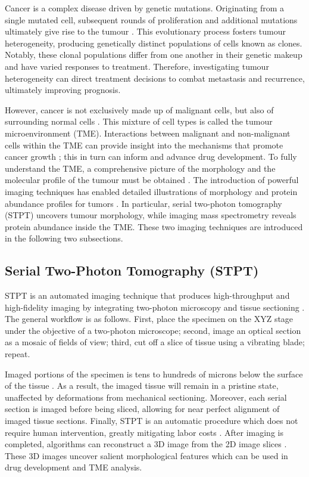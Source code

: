 \documentclass[10pt,twocolumn,letterpaper]{article}
\begin{document}
Cancer is a complex disease driven by genetic mutations. Originating from a single mutated cell, subsequent rounds of proliferation and additional mutations ultimately give rise to the tumour \cite{nowell_1976_the}. This evolutionary process fosters tumour heterogeneity, producing genetically distinct populations of cells known as clones. Notably, these clonal populations differ from one another in their genetic makeup and have varied responses to treatment. Therefore, investigating tumour heterogeneity can direct treatment decisions to combat metastasis and recurrence, ultimately improving prognosis.

However, cancer is not exclusively made up of malignant cells, but also of surrounding normal cells \cite{junttila_2013_influence}. This mixture of cell types is called the tumour microenvironment (TME). Interactions between malignant and non-malignant cells within the TME can provide insight into the mechanisms that promote cancer growth \cite{egeblad_2010_tumors}; this in turn can inform and advance drug development. To fully understand the TME, a comprehensive picture of the morphology and the molecular profile of the tumour must be obtained \cite{heindl_2015_mapping}. The introduction of powerful imaging techniques has enabled detailed illustrations of morphology and protein abundance profiles for tumors \cite{bressan}. In particular, serial two-photon tomography (STPT) uncovers tumour morphology, while imaging mass spectrometry reveals protein abundance inside the TME. These two imaging techniques are introduced in the following two subsections.


\subsection{Serial Two-Photon Tomography (STPT)}

STPT is an automated imaging technique that produces high-throughput and high-fidelity imaging by integrating two-photon microscopy and tissue sectioning \cite{taranda_2021_3d}. The general workflow is as follows. First, place the specimen on the XYZ stage under the objective of a two-photon microscope; second, image an optical section as a mosaic of fields of view; third, cut off a slice of tissue using a vibrating blade; repeat. 

Imaged portions of the specimen is tens to hundreds of microns below the surface of the tissue \cite{amato_2016_whole}. As a result, the imaged tissue will remain in a pristine state, unaffected by deformations from mechanical sectioning. Moreover, each serial section is imaged before being sliced, allowing for near perfect alignment of imaged tissue sections. Finally, STPT is an automatic procedure which does not require human intervention, greatly mitigating labor costs \cite{ragan_2012_serial}. After imaging is completed, algorithms can reconstruct a 3D image from the 2D image slices \cite{gonzalez-solares}. These 3D images uncover salient morphological features which can be used in drug development and TME analysis.
\end{document}

